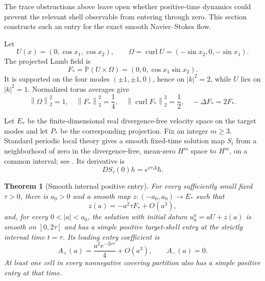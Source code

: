 \documentclass[11pt]{article}
\newtheorem{theorem}{Theorem}[section]
\theoremstyle{definition}
\newcommand{\Pp}{\mathbb P}
\newcommand{\curl}{\operatorname{curl}}
\newcommand{\norm}[1]{\left\lVert #1\right\rVert}
\newcommand{\abs}[1]{\left\lvert #1\right\rvert}
\begin{document}
The trace obstructions above leave open whether positive-time dynamics could
prevent the relevant shell observable from entering through zero.  This
section constructs such an entry for the exact smooth Navier--Stokes flow.

Let
\begin{equation}\label{eq:seed}
 U(x)=(0,\cos x_1,\cos x_2),
 \qquad
 \Omega=\curl U=(-\sin x_2,0,-\sin x_1).
\end{equation}
The projected Lamb field is
\begin{equation}\label{eq:Fstar}
 F_*=\Pp(U\times\Omega)=(0,0,\cos x_1\sin x_2).
\end{equation}
It is supported on the four modes \((\pm1,\pm1,0)\), hence on
\(\abs{k}^2=2\), while \(U\) lies on \(\abs{k}^2=1\).  Normalized torus
averages give
\begin{equation}\label{eq:seed-ledger}
 \norm{\Omega}_2^2=1,
 \quad \norm{F_*}_2^2=\frac14,
 \quad \norm{\curl F_*}_2^2=\frac12,
 \quad -\Delta F_*=2F_*.
\end{equation}

Let \(E_*\) be the finite-dimensional real divergence-free velocity space
on the target modes and let \(P_*\) be the corresponding projection.  Fix
an integer \(m\ge3\).  Standard periodic local theory gives a smooth
fixed-time solution map \(S_t\) from a neighborhood of zero in the
divergence-free, mean-zero \(H^m\) space to \(H^m\), on a common interval;
see \citet{FujitaKato1964,Temam2001}.  Its derivative is
\begin{equation}\label{eq:flow-derivative}
 DS_\tau(0)h=e^{\nu\tau\Delta}h.
\end{equation}

\begin{theorem}[Smooth internal positive entry]\label{thm:entry}
For every sufficiently small fixed \(\tau>0\), there is \(a_0>0\) and a
smooth map \(z:(-a_0,a_0)\to E_*\) such that
\begin{equation}\label{eq:z-expansion}
 z(a)=-a^2\tau F_*+O(a^3),
\end{equation}
and, for every \(0<\abs a<a_0\), the solution with initial datum
\(u_0^a=aU+z(a)\) is smooth on \([0,2\tau]\) and has a simple positive
target-shell entry at the strictly internal time \(t=\tau\).  Its leading
entry coefficient is
\begin{equation}\label{eq:A-entry}
 A_+(a)=\frac{a^2e^{-2\nu\tau}}4+O(a^3),
 \qquad A_-(a)=0.
\end{equation}
At least one cell in every nonnegative covering partition also has a simple
positive entry at that time.
\end{theorem}
\end{document}
